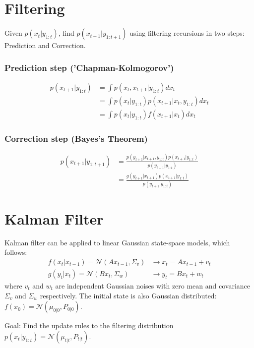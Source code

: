 \documentclass[12pt]{article}
\begin{document}
\section{Filtering}
Given $p(x_t | y_{1:t})$, find $p(x_{t+1} | y_{1:t+1})$ using filtering recursions in two steps: Prediction and Correction.

\subsubsection*{Prediction step ('Chapman-Kolmogorov')}
\begin{align*}
    p(x_{t+1} | y_{1:t}) &= \int p(x_t, x_{t+1} | y_{1:t}) dx_t \\
    &= \int  p(x_t | y_{1:t}) p(x_{t+1} | x_t, y_{1:t}) dx_t \\
    &= \int p(x_t | y_{1:t}) f(x_{t+1} | x_t)dx_t
\end{align*}

\subsubsection*{Correction step (Bayes's Theorem)}
\begin{align*}
    p(x_{t+1} | y_{1:t+1}) &= \frac{p(y_{t+1} | x_{t+1}, y_{1:t}) p(x_{t+1} | y_{1:t})}{p(y_{t+1} | y_{1:t})} \\
    &= \frac{g(y_{t+1} | x_{t+1}) p(x_{t+1} | y_{1:t})}{p(y_{t+1} | y_{1:t})}
\end{align*}

\section{Kalman Filter}
Kalman filter can be applied to linear Gaussian state-space models, which follows:
\begin{align*}
    f(x_t | x_{t-1}) = \mathcal{N}(A x_{t-1}, \Sigma_v) & \longrightarrow x_t = A x_{t-1} + v_t \\
    g(y_{t} | x_{t}) = \mathcal{N}(B x_{t}, \Sigma_w) & \longrightarrow y_t = B x_t + w_t
\end{align*}
where $v_t$ and $w_t$ are independent Gaussian noises with zero mean and covariance $\Sigma_v$ and $\Sigma_w$ respectively. The initial state is also Gaussian distributed:
$f(x_0) = \mathcal{N}(\mu_{0|0}, P_{0|0})$.

Goal: Find the update rules to the filtering distribution $p(x_t | y_{1:t}) = \mathcal{N}(\mu_{t|t}, P_{t|t})$.
\end{document}
